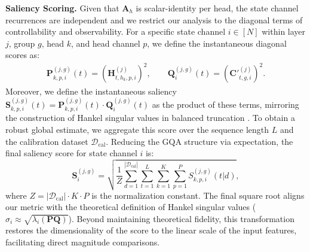 \documentclass{article}
\theoremstyle{plain}
\theoremstyle{definition}
\theoremstyle{remark}
\begin{document}
\textbf{Saliency Scoring.} Given that $\bm{A}_h$ is scalar-identity per head, the state channel recurrences are independent and we restrict our analysis to the diagonal terms of controllability and observability. For a specific state channel $i \in [N]$ within layer $j$, group $g$, head $k$, and head channel $p$, we define the instantaneous diagonal scores as:
\begin{align*}
\bm{P}^{(j, g)}_{k, p, i} (t) = \left( \bm{H}^{(j)}_{t, h_k, p, i} \right)^2, \qquad \bm{Q}^{(j, g)}_{i} (t) = \left( \bm{C}'^{(j)}_{t, g, i} \right)^2.
\end{align*}
Moreover, we define the instantaneous saliency $\bm{S}^{(j, g)}_{k, p, i} (t) = \bm{P}^{(j, g)}_{k, p, i} (t) \cdot \bm{Q}^{(j, g)}_{i} (t)$ as the product of these terms, mirroring the construction of Hankel singular values in balanced truncation \citep{moore_principal_1981}. To obtain a robust global estimate, we aggregate this score over the sequence length $L$ and the calibration dataset $\mathcal{D}_{\text{cal}}$. Reducing the GQA structure via expectation, the final saliency score for state channel $i$ is:
\begin{equation}
\label{eq:salience}
\bm{S}^{(j, g)}_i = \sqrt{\frac{1}{Z} \sum_{d=1}^{|\mathcal{D}_{\text{cal}}|} \sum_{t=1}^{L} \sum_{k=1}^{K} \sum_{p=1}^{P} S^{(j, g)}_{k, p, i} (t | d)},
\end{equation}
where $Z = |\mathcal{D}_{\text{cal}}| \cdot K \cdot P$ is the normalization constant. The final square root aligns our metric with the theoretical definition of Hankel singular values ($\sigma_i \approx \sqrt{\lambda_i(\bm{P}\bm{Q})}$). Beyond maintaining theoretical fidelity, this transformation restores the dimensionality of the score to the linear scale of the input features, facilitating direct magnitude comparisons.
\end{document}

